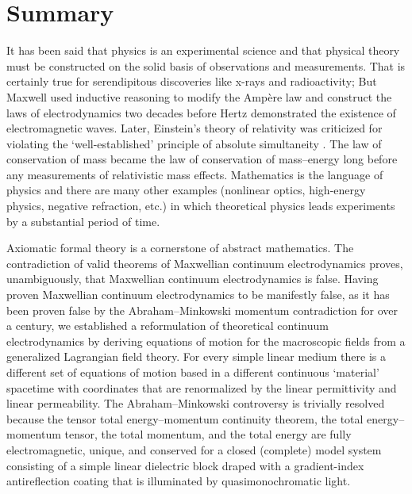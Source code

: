 \documentclass[twocolumn,amssymb,eqsecnum,aps,pra]{revtex4-2}
\begin{document}
\section{Summary}
\par
It has been said that physics is an experimental science and that
physical theory must be constructed on the solid basis of
observations and measurements.
That is certainly true for serendipitous discoveries like x-rays and 
radioactivity; But Maxwell \cite{BIMaxwell} used inductive reasoning
to modify the Amp\`ere law and construct the laws of electrodynamics
two decades before Hertz \cite{BIHertz} demonstrated the existence
of electromagnetic waves.
Later, Einstein's theory of relativity was criticized for violating
the `well-established' principle of absolute
simultaneity \cite{BIEhrenfestQuote}.
The law of conservation of mass became the law of conservation of
mass--energy long before any measurements of relativistic mass
effects.
Mathematics is the language of physics and there are many other
examples (nonlinear optics, high-energy physics, negative refraction,
etc.) in which theoretical physics 
leads experiments by a substantial period of time.
\par
Axiomatic formal theory is a cornerstone of abstract mathematics.
The contradiction of valid theorems of Maxwellian continuum
electrodynamics proves, unambiguously, that Maxwellian continuum
electrodynamics is false.
Having proven Maxwellian continuum electrodynamics to be manifestly 
false, as it has been proven false by the Abraham--Minkowski momentum
contradiction for over a century, we established a reformulation of
theoretical continuum electrodynamics by deriving equations of motion
for the macroscopic fields from a generalized Lagrangian field theory.
For every simple linear medium there is a different set of equations
of motion based in a different continuous `material' spacetime with
coordinates that are renormalized by the linear permittivity and linear
permeability.
The Abraham--Minkowski controversy is trivially resolved because
the tensor total energy--momentum continuity theorem, the total
energy--momentum tensor, the total momentum, and the total energy are
fully electromagnetic, unique, and conserved for a closed (complete)
model system consisting of a simple linear dielectric block draped
with a gradient-index antireflection coating that is illuminated by
quasimonochromatic light.
\par
\end{document}
